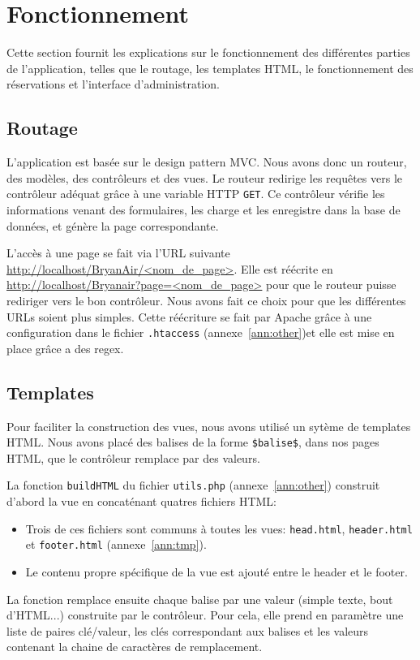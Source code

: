 \documentclass[12pt,a4paper]{article}
\begin{document}
	\section{Fonctionnement}
		Cette section fournit les explications sur le fonctionnement des différentes parties de l'application, telles que le routage, les templates HTML, le fonctionnement des réservations et l'interface d'adminis\-tration.
		\subsection{Routage}
		L'application est basée sur le design pattern MVC. Nous avons donc un routeur, des modèles, des contrôleurs et des vues. Le routeur redirige les requêtes vers le contrôleur adéquat grâce à une variable HTTP \texttt{GET}. Ce contrôleur vérifie les informations venant des formulaires, les charge et les enregistre dans la base de données, et génère la page correspondante.

		L'accès à une page se fait via l'URL suivante \url{http://localhost/BryanAir/<nom_de_page>}. Elle est réécrite en \url{http://localhost/Bryanair?page=<nom_de_page>} pour que le routeur puisse rediriger vers le bon contrôleur. Nous avons fait ce choix pour que les différentes URLs soient plus simples. Cette réécriture se fait par Apache grâce à une configuration dans le fichier \texttt{.htaccess} (annexe~\ref{ann:other})et elle est mise en place grâce a des regex.

		\subsection{Templates}
		Pour faciliter la construction des vues, nous avons utilisé un sytème de templates HTML. Nous avons placé des balises de la forme \texttt{\$balise\$}, dans nos pages HTML, que le contrôleur remplace par des valeurs.

    La fonction \texttt{buildHTML} du fichier \texttt{utils.php} (annexe~\ref{ann:other}) construit d'abord la vue en concaté\-nant quatres fichiers HTML:
    \begin{itemize}
      \item Trois de ces fichiers sont communs à toutes les vues: \texttt{head.html}, \texttt{header.html} et \texttt{footer.html} (annexe~\ref{ann:tmp}).
      \item Le contenu propre spécifique de la vue est ajouté entre le header et le footer.
    \end{itemize}

		La fonction remplace ensuite chaque balise par une valeur (simple texte, bout d'HTML...) construite par le contrôleur. Pour cela, elle prend en paramètre une liste de paires clé/valeur, les clés correspondant aux balises et les valeurs contenant la chaine de caractères de remplacement.
\end{document}
